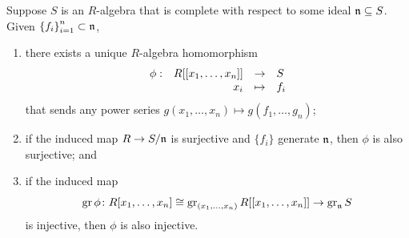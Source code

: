 \begin{theorem}\label{thm:power-series-completions}
    Suppose \(S\) is an \(R\)-algebra that is complete with respect to some ideal \(\mathfrak{n} \subseteq S\).
    Given \({\{f_i\}}_{i=1}^n \subset \mathfrak{n}\),
    \begin{enumerate}[label={(\alph*)}, itemsep=0mm]
        \item there exists a unique \(R\)-algebra homomorphism
            \begin{equation*}
                \begin{array}{rrcl} {\phi}: & {R[[x_1,\hdots,x_n]]} &\to & {S} \\ & {x_i} &\mapsto & {f_i} \end{array}
            \end{equation*}
            that sends any power series \(g(x_1,\hdots,x_n) \mapsto g(f_1,\hdots,g_n)\);
        \item if the induced map \(R \to S/\mathfrak{n}\) is surjective and \(\{f_i\}\) generate \(\mathfrak{n}\),
            then \(\phi\) is also surjective; and
        \item if the induced map
            \begin{equation*}
                \operatorname{gr}\phi\colon R[x_1,\hdots,x_n]\cong\operatorname{gr}_{(x_1,\hdots,x_n)} R[[x_1,\hdots,x_n]]\to\operatorname{gr}_{\mathfrak{n}} S
            \end{equation*}
            is injective, then \(\phi\) is also injective.
    \end{enumerate}
\end{theorem}
